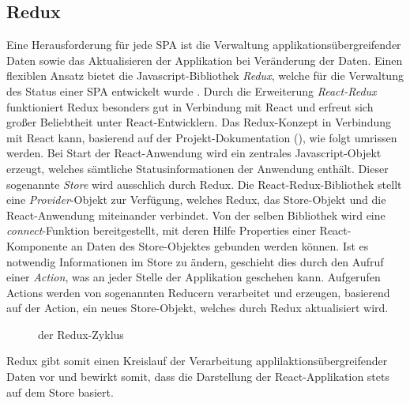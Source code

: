 \subsection{Redux}
Eine Herausforderung für jede SPA ist die Verwaltung applikationsübergreifender Daten sowie das Aktualisieren der Applikation bei Veränderung der Daten.
Einen flexiblen Ansatz bietet die Javascript-Bibliothek \emph{Redux}, welche für die Verwaltung des Status einer SPA entwickelt wurde \autocite[vgl.]{Redux:Introduction}. Durch die Erweiterung \emph{React-Redux} funktioniert Redux besonders gut in Verbindung mit React und erfreut sich großer Beliebtheit unter React-Entwicklern.
Das Redux-Konzept in Verbindung mit React kann, basierend auf der Projekt-Dokumentation (\cite{ReactRedux:QuickStart}), wie folgt umrissen werden. Bei Start der React-Anwendung wird ein zentrales Javascript-Objekt erzeugt, welches sämtliche Statusinformationen der Anwendung enthält. Dieser sogenannte \emph{Store} wird ausschlich durch Redux. Die React-Redux-Bibliothek stellt eine \emph{Provider}-Objekt zur Verfügung, welches Redux, das Store-Objekt und die React-Anwendung miteinander verbindet. Von der selben Bibliothek wird eine \emph{connect}-Funktion bereitgestellt, mit deren Hilfe Properties einer React-Komponente an Daten des Store-Objektes gebunden werden können. Ist es notwendig Informationen im Store zu ändern, geschieht dies durch den Aufruf einer \emph{Action}, was an jeder Stelle der Applikation geschehen kann. Aufgerufen Actions werden von sogenannten Reducern verarbeitet und erzeugen, basierend auf der Action, ein neues Store-Objekt, welches durch Redux aktualisiert wird.
\begin{figure}[H]
\centering
{}
\caption[Redux-Zyklus]{der Redux-Zyklus}
\label{figure:ReduxCycle}
\end{figure}
Redux gibt somit einen Kreislauf der Verarbeitung applilaktionsübergreifender Daten vor und bewirkt somit, dass die Darstellung der React-Applikation stets auf dem Store basiert.


